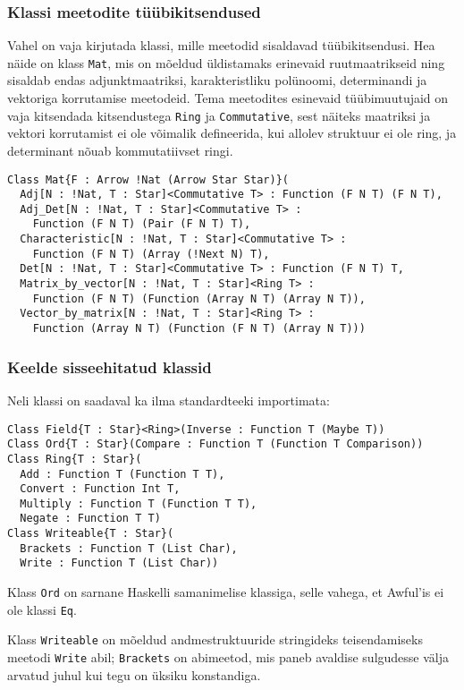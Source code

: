 \documentclass[12pt]{article}
\begin{document}
      \subsubsection{Klassi meetodite tüübikitsendused}
        Vahel on vaja kirjutada klassi, mille meetodid sisaldavad tüübikitsendusi. Hea näide on klass \verb!Mat!, mis on mõeldud üldistamaks erinevaid ruutmaatrikseid ning sisaldab endas adjunktmaatriksi, karakteristliku polünoomi, determinandi ja vektoriga korrutamise meetodeid. Tema meetodites esinevaid tüübimuutujaid on vaja kitsendada kitsendustega \verb!Ring! ja \verb!Commutative!, sest näiteks maatriksi ja vektori korrutamist ei ole võimalik defineerida, kui allolev struktuur ei ole ring, ja determinant nõuab kommutatiivset ringi.

        \begin{verbatim}Class Mat{F : Arrow !Nat (Arrow Star Star)}(
  Adj[N : !Nat, T : Star]<Commutative T> : Function (F N T) (F N T),
  Adj_Det[N : !Nat, T : Star]<Commutative T> :
    Function (F N T) (Pair (F N T) T),
  Characteristic[N : !Nat, T : Star]<Commutative T> :
    Function (F N T) (Array (!Next N) T),
  Det[N : !Nat, T : Star]<Commutative T> : Function (F N T) T,
  Matrix_by_vector[N : !Nat, T : Star]<Ring T> :
    Function (F N T) (Function (Array N T) (Array N T)),
  Vector_by_matrix[N : !Nat, T : Star]<Ring T> :
    Function (Array N T) (Function (F N T) (Array N T)))\end{verbatim}
      \subsubsection{Keelde sisseehitatud klassid}\label{klassmaatriks}
        Neli klassi on saadaval ka ilma standardteeki importimata:

        \begin{verbatim}Class Field{T : Star}<Ring>(Inverse : Function T (Maybe T))
Class Ord{T : Star}(Compare : Function T (Function T Comparison))
Class Ring{T : Star}(
  Add : Function T (Function T T),
  Convert : Function Int T,
  Multiply : Function T (Function T T),
  Negate : Function T T)
Class Writeable{T : Star}(
  Brackets : Function T (List Char),
  Write : Function T (List Char))\end{verbatim}

        Klass \verb!Ord! on sarnane Haskelli samanimelise klassiga, selle vahega, et Awful'is ei ole klassi \verb!Eq!.

        Klass \verb!Writeable! on mõeldud andmestruktuuride stringideks teisendamiseks meetodi \verb!Write! abil; \verb!Brackets! on abimeetod, mis paneb avaldise sulgudesse välja arvatud juhul kui tegu on üksiku konstandiga.
\end{document}

